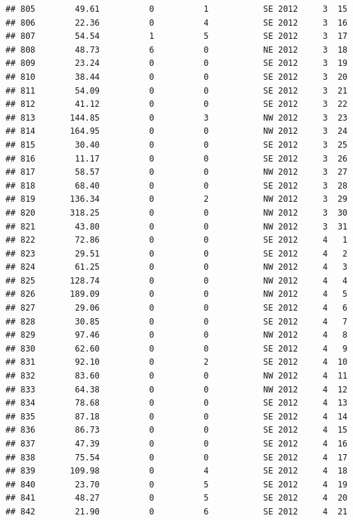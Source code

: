 \documentclass[
]{article}
\begin{document}
\begin{verbatim}
## 805        49.61          0          1           SE 2012     3  15
## 806        22.36          0          4           SE 2012     3  16
## 807        54.54          1          5           SE 2012     3  17
## 808        48.73          6          0           NE 2012     3  18
## 809        23.24          0          0           SE 2012     3  19
## 810        38.44          0          0           SE 2012     3  20
## 811        54.09          0          0           SE 2012     3  21
## 812        41.12          0          0           SE 2012     3  22
## 813       144.85          0          3           NW 2012     3  23
## 814       164.95          0          0           NW 2012     3  24
## 815        30.40          0          0           SE 2012     3  25
## 816        11.17          0          0           SE 2012     3  26
## 817        58.57          0          0           NW 2012     3  27
## 818        68.40          0          0           SE 2012     3  28
## 819       136.34          0          2           NW 2012     3  29
## 820       318.25          0          0           NW 2012     3  30
## 821        43.80          0          0           NW 2012     3  31
## 822        72.86          0          0           SE 2012     4   1
## 823        29.51          0          0           SE 2012     4   2
## 824        61.25          0          0           NW 2012     4   3
## 825       128.74          0          0           NW 2012     4   4
## 826       189.09          0          0           NW 2012     4   5
## 827        29.06          0          0           SE 2012     4   6
## 828        30.85          0          0           SE 2012     4   7
## 829        97.46          0          0           NW 2012     4   8
## 830        62.60          0          0           SE 2012     4   9
## 831        92.10          0          2           SE 2012     4  10
## 832        83.60          0          0           NW 2012     4  11
## 833        64.38          0          0           NW 2012     4  12
## 834        78.68          0          0           SE 2012     4  13
## 835        87.18          0          0           SE 2012     4  14
## 836        86.73          0          0           SE 2012     4  15
## 837        47.39          0          0           SE 2012     4  16
## 838        75.54          0          0           SE 2012     4  17
## 839       109.98          0          4           SE 2012     4  18
## 840        23.70          0          5           SE 2012     4  19
## 841        48.27          0          5           SE 2012     4  20
## 842        21.90          0          6           SE 2012     4  21

\end{verbatim}
\end{document}
